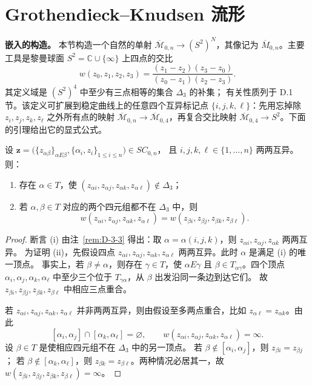 
\section{Grothendieck--Knudsen 流形}\label{sec:D-4}

\noindent\textbf{嵌入的构造。}
本节构造一个自然的单射 $\overline{\mathcal M}_{0,n}\to(S^2)^N$，其像记为
$\overline M_{0,n}$。主要工具是黎曼球面 $S^2=\mathbb C\cup\{\infty\}$
上四点的交比
\[
  w(z_0,z_1,z_2,z_3)=
  \frac{(z_1-z_2)(z_3-z_0)}{(z_0-z_1)(z_2-z_3)}.
\]
其定义域是 $(S^2)^4$ 中至少有三点相等的集合 $\Delta_3$ 的补集；
有关性质列于 D.1 节。该定义可扩展到稳定曲线上的任意四个互异标记点
$\{i,j,k,\ell\}$：先用忘掉除 $z_i,z_j,z_k,z_\ell$ 之外所有点的映射
$\overline{\mathcal M}_{0,n}\to\overline{\mathcal M}_{0,4}$，再复合交比映射
$\overline{\mathcal M}_{0,4}\to S^2$。下面的引理给出它的显式公式。

\begin{lemma}\label{lem:D-4-1}
设 $\mathbf z=\bigl(\{z_{\alpha\beta}\}_{\alpha E\beta},
\{\alpha_i,z_i\}_{1\le i\le n}\bigr)\in SC_{0,n}$，
且 $i,j,k,\ell\in\{1,\ldots,n\}$ 两两互异。则：
\begin{enumerate}
\item[(i)] 存在 $\alpha\in T$，使
$(z_{\alpha i},z_{\alpha j},z_{\alpha k},z_{\alpha\ell})\notin\Delta_3$；
\item[(ii)] 若 $\alpha,\beta\in T$ 对应的两个四元组都不在 $\Delta_3$ 中，则
\[
  w(z_{\alpha i},z_{\alpha j},z_{\alpha k},z_{\alpha\ell})
  =w(z_{\beta i},z_{\beta j},z_{\beta k},z_{\beta\ell}).
\]
\end{enumerate}
\end{lemma}
\begin{proof}
断言 (i) 由注~\ref{rem:D-3-3} 得出：取 $\alpha=\alpha(i,j,k)$，则
$z_{\alpha i},z_{\alpha j},z_{\alpha k}$ 两两互异。
为证明 (ii)，先假设四点 $z_{\alpha i},z_{\alpha j},z_{\alpha k},
z_{\alpha\ell}$ 两两互异。此时 $\alpha$ 是满足 (i) 的唯一顶点。
事实上，若 $\beta\ne\alpha$，则存在 $\gamma\in T$，使
$\alpha E\gamma$ 且 $\beta\in T_{\alpha\gamma}$。四个顶点
$\alpha_i,\alpha_j,\alpha_k,\alpha_\ell$ 中至少三个位于
$T_{\gamma\alpha}$，从 $\beta$ 出发沿同一条边到达它们。
故 $z_{\beta i},z_{\beta j},z_{\beta k},z_{\beta\ell}$ 中相应三点重合。

若 $z_{\alpha i},z_{\alpha j},z_{\alpha k},z_{\alpha\ell}$
并非两两互异，则由假设至多两点重合，比如
$z_{\alpha\ell}=z_{\alpha k}$。由此
\[
  [\alpha_i,\alpha_j]\cap[\alpha_k,\alpha_\ell]=\varnothing,
  \qquad w(z_{\alpha i},z_{\alpha j},z_{\alpha k},z_{\alpha\ell})=\infty.
\]
设 $\beta\in T$ 是使相应四元组不在 $\Delta_3$ 中的另一顶点。
若 $\beta\notin[\alpha_i,\alpha_j]$，则 $z_{\beta i}=z_{\beta j}$；
若 $\beta\notin[\alpha_k,\alpha_\ell]$，则
$z_{\beta k}=z_{\beta\ell}$。两种情况必居其一，故
$w(z_{\beta i},z_{\beta j},z_{\beta k},z_{\beta\ell})=\infty$。
\end{proof}

